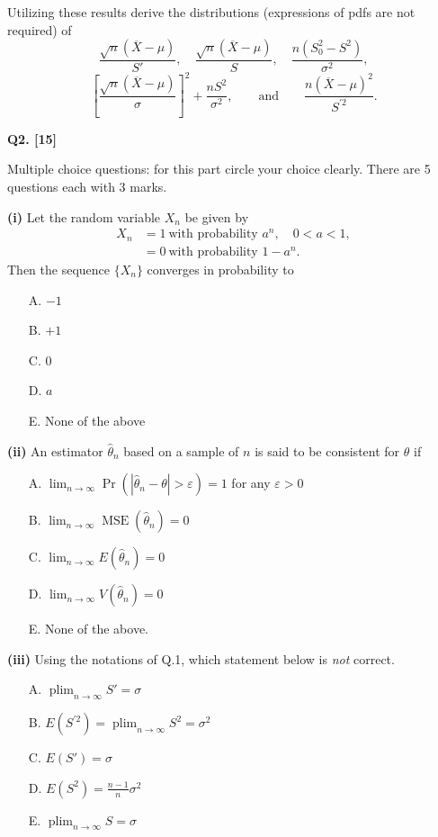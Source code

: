 \documentclass[11pt]{article}
\begin{document}
Utilizing these results derive the distributions (expressions of pdfs are not required) of
\[
\frac{\sqrt n(\overline X-\mu)}{S'},\quad
\frac{\sqrt n(\overline X-\mu)}{S},\quad
\frac{n(S_0^2-S^2)}{\sigma^2},
\]
\[
\left[\frac{\sqrt n(\overline X-\mu)}{\sigma}\right]^2
+\frac{nS^2}{\sigma^2},
\qquad\text{and}\qquad
\frac{n(\overline X-\mu)^2}{S^{\prime 2}}.
\]

\bigskip

\textbf{Q2. [15]}

Multiple choice questions: for this part circle your choice clearly. There are 5 questions each with 3 marks.

\textbf{(i)} Let the random variable $X_n$ be given by
\[
\begin{aligned}
X_n&=1\ \text{with probability }a^n,\quad 0<a<1,\\
&=0\ \text{with probability }1-a^n.
\end{aligned}
\]
Then the sequence $\{X_n\}$ converges in probability to
\begin{enumerate}
\setlength{\itemsep}{0pt}\setlength{\parsep}{0pt}\setlength{\topsep}{2pt}
\item[A.] $-1$
\item[B.] $+1$
\item[C.] $0$
\item[D.] $a$
\item[E.] None of the above
\end{enumerate}

\textbf{(ii)} An estimator $\hat\theta_n$ based on a sample of $n$ is said to be consistent for $\theta$ if
\begin{enumerate}
\setlength{\itemsep}{0pt}\setlength{\parsep}{0pt}\setlength{\topsep}{2pt}
\item[A.] $\displaystyle\lim_{n\to\infty}\Pr(|\hat\theta_n-\theta|>\varepsilon)=1$ for any $\varepsilon>0$
\item[B.] $\displaystyle\lim_{n\to\infty}\operatorname{MSE}(\hat\theta_n)=0$
\item[C.] $\displaystyle\lim_{n\to\infty}E(\hat\theta_n)=0$
\item[D.] $\displaystyle\lim_{n\to\infty}V(\hat\theta_n)=0$
\item[E.] None of the above.
\end{enumerate}

\textbf{(iii)} Using the notations of Q.1, which statement below is \emph{not} correct.
\begin{enumerate}
\setlength{\itemsep}{0pt}\setlength{\parsep}{0pt}\setlength{\topsep}{2pt}
\item[A.] $\displaystyle\operatorname{plim}_{n\to\infty}S'=\sigma$
\item[B.] $\displaystyle E(S^{\prime 2})=\operatorname{plim}_{n\to\infty}S^2=\sigma^2$
\item[C.] $\displaystyle E(S')=\sigma$
\item[D.] $\displaystyle E(S^2)=\frac{n-1}{n}\sigma^2$
\item[E.] $\displaystyle\operatorname{plim}_{n\to\infty}S=\sigma$
\end{enumerate}
\end{document}
